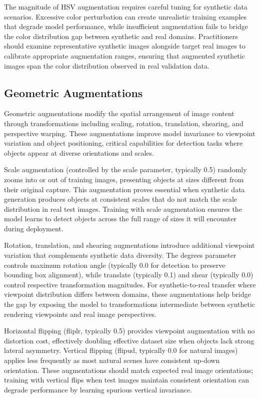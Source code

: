 The magnitude of HSV augmentation requires careful tuning for synthetic data scenarios. Excessive color perturbation can create unrealistic training examples that degrade model performance, while insufficient augmentation fails to bridge the color distribution gap between synthetic and real domains. Practitioners should examine representative synthetic images alongside target real images to calibrate appropriate augmentation ranges, ensuring that augmented synthetic images span the color distribution observed in real validation data.

\subsection{Geometric Augmentations}

Geometric augmentations modify the spatial arrangement of image content through transformations including scaling, rotation, translation, shearing, and perspective warping. These augmentations improve model invariance to viewpoint variation and object positioning, critical capabilities for detection tasks where objects appear at diverse orientations and scales.

Scale augmentation (controlled by the scale parameter, typically 0.5) randomly zooms into or out of training images, presenting objects at sizes different from their original capture. This augmentation proves essential when synthetic data generation produces objects at consistent scales that do not match the scale distribution in real test images. Training with scale augmentation ensures the model learns to detect objects across the full range of sizes it will encounter during deployment.

Rotation, translation, and shearing augmentations introduce additional viewpoint variation that complements synthetic data diversity. The degrees parameter controls maximum rotation angle (typically 0.0 for detection to preserve bounding box alignment), while translate (typically 0.1) and shear (typically 0.0) control respective transformation magnitudes. For synthetic-to-real transfer where viewpoint distribution differs between domains, these augmentations help bridge the gap by exposing the model to transformations intermediate between synthetic rendering viewpoints and real image perspectives.

Horizontal flipping (fliplr, typically 0.5) provides viewpoint augmentation with no distortion cost, effectively doubling effective dataset size when objects lack strong lateral asymmetry. Vertical flipping (flipud, typically 0.0 for natural images) applies less frequently as most natural scenes have consistent up-down orientation. These augmentations should match expected real image orientations; training with vertical flips when test images maintain consistent orientation can degrade performance by learning spurious vertical invariance.

